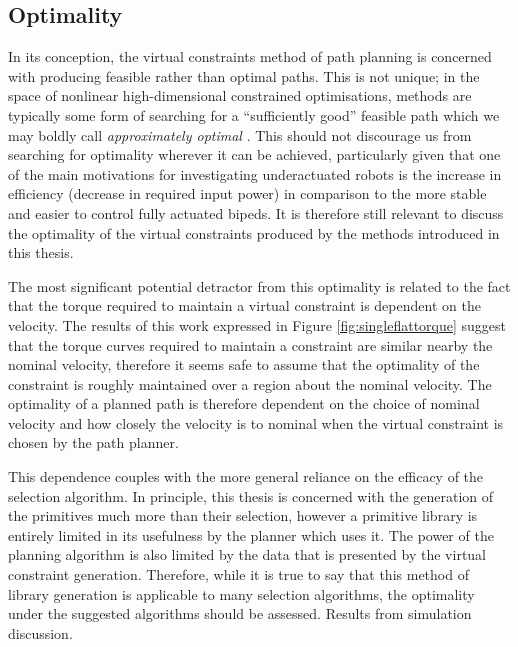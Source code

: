 \subsection{Optimality}
In its conception, the virtual constraints method of path planning is concerned with producing feasible rather than optimal paths. This is not unique; in the space of nonlinear high-dimensional constrained optimisations, methods are typically some form of searching for a ``sufficiently good'' feasible path which we may boldly call \textit{approximately optimal} \cite{kavraki1996probabilistic, hwang1992potential, quinlan1993elastic}. This should not discourage us from searching for optimality wherever it can be achieved, particularly given that one of the main motivations for investigating underactuated robots is the increase in efficiency (decrease in required input power) in comparison to the more stable and easier to control fully actuated bipeds. It is therefore still relevant to discuss the optimality of the virtual constraints produced by the methods introduced in this thesis. 

The most significant potential detractor from this optimality is related to the fact that the torque required to maintain a virtual constraint is dependent on the velocity. The results of this work expressed in Figure \ref{fig:singleflattorque} suggest that the torque curves required to maintain a constraint are similar nearby the nominal velocity, therefore it seems safe to assume that the optimality of the constraint is roughly maintained over a region about the nominal velocity. The optimality of a planned path is therefore dependent on the choice of nominal velocity and how closely the velocity is to nominal when the virtual constraint is chosen by the path planner.

This dependence couples with the more general reliance on the efficacy of the selection algorithm. In principle, this thesis is concerned with the generation of the primitives much more than their selection, however a primitive library is entirely limited in its usefulness by the planner which uses it. The power of the planning algorithm is also limited by the data that is presented by the virtual constraint generation. Therefore, while it is true to say that this method of library generation is applicable to many selection algorithms, the optimality under the suggested algorithms should be assessed. {\color{red} Results from simulation discussion.}

